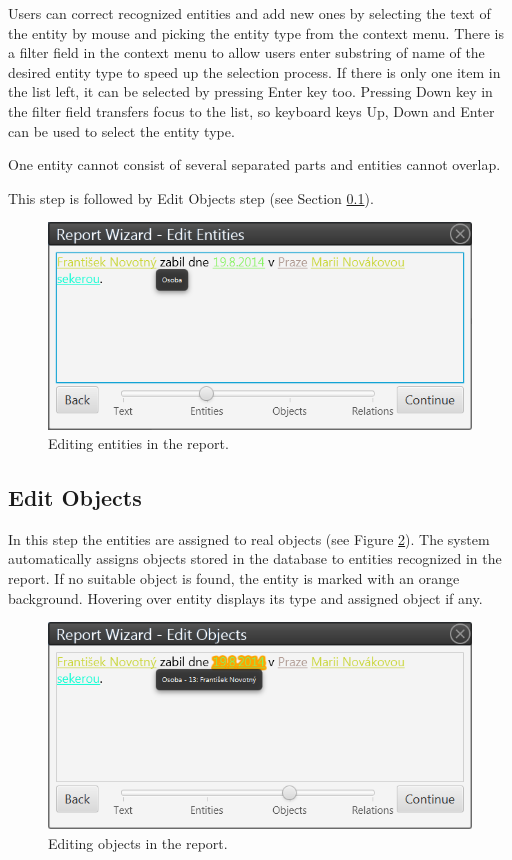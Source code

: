 Users can correct recognized entities and add new ones by selecting the text
of the entity by mouse and picking the entity type from the context menu.
There is a filter field in the context menu to allow users enter substring of
name of the desired entity type to speed up the selection process. If there is
only one item in the list left, it can be selected by pressing Enter key too.
Pressing Down key in the filter field transfers focus to the list, so keyboard
keys Up, Down and Enter can be used to select the entity type.

One entity cannot consist of several separated parts and entities cannot
overlap.

This step is followed by Edit Objects step (see Section
\ref{sssec:EditObjects}).

\begin{figure}[!htb]
        \centering
        \includegraphics[width=\textwidth]{Images/entities}
        \caption{Editing entities in the report.}
        \label{fig:Entities}
\end{figure}

\subsection{Edit Objects}
\label{sssec:EditObjects}

In this step the entities are assigned to real objects (see Figure
\ref{fig:Objects}). The system automatically assigns objects stored in the
database to entities recognized in the report. If no suitable object is
found, the entity is marked with an orange background. Hovering over entity
displays its type and assigned object if any.

\begin{figure}[!htb]
        \centering
        \includegraphics[width=\textwidth]{Images/objects}
        \caption{Editing objects in the report.}
        \label{fig:Objects}
\end{figure}


